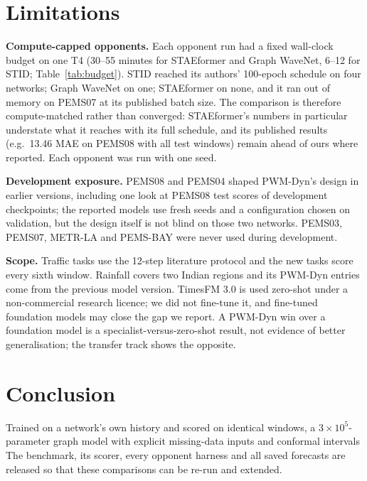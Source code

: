 \section{Limitations}
\label{sec:limits}

\textbf{Compute-capped opponents.} Each opponent run had a fixed wall-clock budget on one T4 (30--55 minutes for
STAEformer and Graph WaveNet, 6--12 for STID; Table~\ref{tab:budget}). STID reached its authors' 100-epoch schedule
on four networks; Graph WaveNet on one; STAEformer on none, and it ran out of memory on PEMS07 at its published batch
size. The comparison is therefore compute-matched rather than converged: STAEformer's numbers in particular
understate what it reaches with its full schedule, and its published results (e.g.\ 13.46 MAE on PEMS08 with all test
windows) remain ahead of ours where reported. Each opponent was run with one seed.

\textbf{Development exposure.} PEMS08 and PEMS04 shaped PWM-Dyn's design in earlier versions, including one look at
PEMS08 test scores of development checkpoints; the reported models use fresh seeds and a configuration chosen on
validation, but the design itself is not blind on those two networks. PEMS03, PEMS07, METR-LA and PEMS-BAY were never
used during development.

\textbf{Scope.} Traffic tasks use the 12-step literature protocol and the new tasks score every sixth window.
Rainfall covers two Indian regions and its PWM-Dyn entries come from the previous model version. TimesFM 3.0 is used
zero-shot under a non-commercial research licence; we did not fine-tune it, and fine-tuned foundation models may
close the gap we report. A PWM-Dyn win over a foundation model is a specialist-versus-zero-shot result, not evidence
of better generalisation; the transfer track shows the opposite.

\section{Conclusion}

Trained on a network's own history and scored on identical windows, a $3\times10^5$-parameter graph model with
explicit missing-data inputs and conformal intervals  The benchmark, its scorer, every
opponent harness and all saved forecasts are released so that these comparisons can be re-run and extended.
